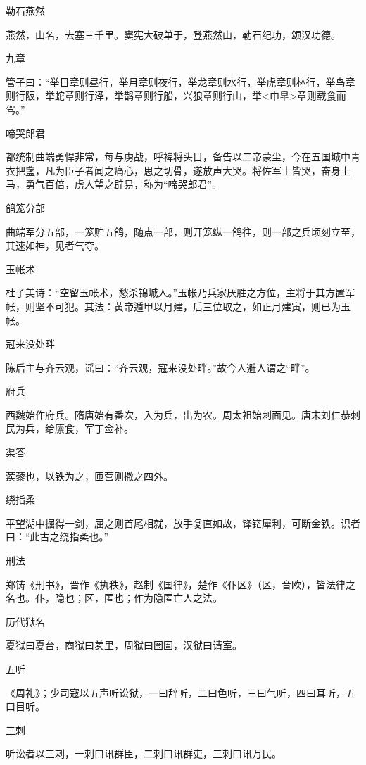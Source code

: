 \documentclass[a4paper,12pt,UTF8,twoside]{ctexbook}
\begin{document}
    勒石燕然
    
    燕然，山名，去塞三千里。窦宪大破单于，登燕然山，勒石纪功，颂汉功德。
    
    九章
    
    管子曰：“举日章则昼行，举月章则夜行，举龙章则水行，举虎章则林行，举鸟章则行阪，举蛇章则行泽，举鹊章则行船，兴狼章则行山，举<巾臯>章则载食而驾。”
    
    啼哭郎君
    
    都统制曲端勇悍非常，每与虏战，呼裨将头目，备告以二帝蒙尘，今在五国城中青衣把盏，凡为臣子者闻之痛心，思之切骨，遂放声大哭。将佐军士皆哭，奋身上马，勇气百倍，虏人望之辟易，称为“啼哭郎君”。
    
    鸽笼分部
    
    曲端军分五部，一笼贮五鸽，随点一部，则开笼纵一鸽往，则一部之兵顷刻立至，其速如神，见者气夺。
    
    玉帐术
    
    杜子美诗：“空留玉帐术，愁杀锦城人。”玉帐乃兵家厌胜之方位，主将于其方置军帐，则坚不可犯。其法：黄帝遁甲以月建，后三位取之，如正月建寅，则已为玉帐。
    
    冠来没处畔
    
    陈后主与齐云观，谣曰：“齐云观，寇来没处畔。”故今人避人谓之“畔”。
    
    府兵
    
    西魏始作府兵。隋唐始有番次，入为兵，出为农。周太祖始刺面见。唐末刘仁恭刺民为兵，给廪食，军丁佥补。
    
    渠答
    
    蒺藜也，以铁为之，匝营则撒之四外。
    
    绕指柔
    
    平望湖中掘得一剑，屈之则首尾相就，放手复直如故，锋铓犀利，可断金铁。识者曰：“此古之绕指柔也。”
    
    刑法
    
    郑铸《刑书》，晋作《执秩》，赵制《国律》，楚作《仆区》（区，音欧），皆法律之名也。仆，隐也；区，匿也；作为隐匿亡人之法。
    
    历代狱名
    
    夏狱曰夏台，商狱曰羑里，周狱曰囹圄，汉狱曰请室。
    
    五听
    
    《周礼》；少司寇以五声听讼狱，一曰辞听，二曰色听，三曰气听，四曰耳听，五曰目听。
    
    三刺
    
    听讼者以三刺，一刺曰讯群臣，二刺曰讯群吏，三刺曰讯万民。
    
\end{document}
